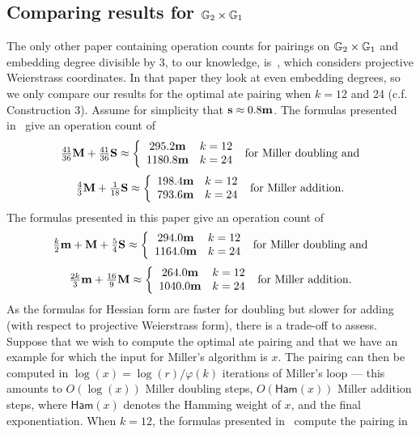 \subsection{Comparing results for $\mathbb{G}_{2} \times \mathbb{G}_{1}$}

The only other paper containing operation counts for pairings on $\mathbb{G}_{2} \times \mathbb{G}_{1}$
and embedding degree divisible by 3, to our knowledge, is~\cite{2009/craig}, which considers projective Weierstrass coordinates.
In that paper they look at even embedding degrees, so we only compare our results
for the optimal ate pairing when $k=12$ and 24 (c.f. Construction 3).
Assume for simplicity that $\textbf{s} \approx 0.8\textbf{m}$.
The formulas presented in~\cite{2009/craig} give an operation count of
$$\tfrac{41}{36}\textbf{M} + \tfrac{41}{36}\textbf{S} \approx
\left\{ \begin{array}{cc}
295.2\textbf{m} & k=12 \\
1180.8\textbf{m} & k=24
\end{array} \right. 
\text{ for Miller doubling and}$$ 
$$\tfrac{4}{3}\textbf{M} + \tfrac{1}{18}\textbf{S} \approx
\left\{ \begin{array}{cc}
198.4\textbf{m} & k=12 \\
793.6\textbf{m} & k=24
\end{array} \right. 
\text{ for Miller addition}.$$ 
The formulas presented in this paper give an operation count of
$$\tfrac{k}{2}\textbf{m} + \textbf{M} + \tfrac{5}{4}\textbf{S} \approx
\left\{ \begin{array}{cc}
294.0\textbf{m} & k=12 \\
1164.0\textbf{m} & k=24
\end{array} \right. 
\text{ for Miller doubling and}$$ 
$$\tfrac{2k}{3}\textbf{m} + \tfrac{16}{9}\textbf{M} \approx
\left\{ \begin{array}{cc}
264.0\textbf{m} & k=12 \\
1040.0\textbf{m} & k=24
\end{array} \right. 
\text{ for Miller addition.}$$ 
As the formulas for Hessian form are faster for doubling but slower for adding (with respect to projective Weierstrass form), there is a trade-off to assess.
Suppose that we wish to compute the optimal ate pairing and that we have 
an example for which the input for Miller's algorithm is $x$. 
The pairing can then be computed in $\log(x) = \log(r)/\varphi(k)$
iterations of Miller's loop --- this amounts to $O(\log(x))$ Miller doubling steps,
$O(\mathsf{Ham}(x))$ Miller addition steps, where $\mathsf{Ham}(x)$ denotes the Hamming weight of $x$, and the final exponentiation.
%
When $k=12$, the formulas presented in~\cite{2009/craig} compute the pairing in
